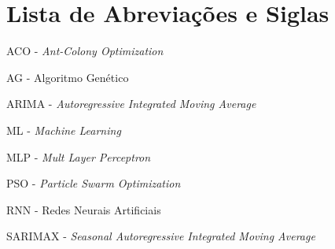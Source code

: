 \chapter*{Lista de Abreviações e Siglas}
\linespread{1.5}

ACO - \textit{Ant-Colony Optimization}\bigskip

AG - Algoritmo Genético\bigskip

ARIMA - \textit{Autoregressive Integrated Moving Average}\bigskip

ML - \textit{Machine Learning}\bigskip

MLP - \textit{Mult Layer Perceptron}\bigskip

PSO - \textit{Particle Swarm Optimization}\bigskip

RNN - Redes Neurais Artificiais\bigskip

SARIMAX - \textit{Seasonal Autoregressive Integrated Moving Average}\bigskip
